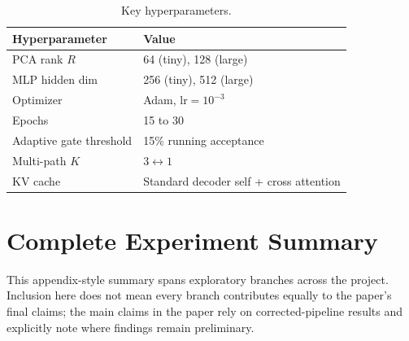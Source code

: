 \documentclass[11pt,a4paper]{article}
\begin{document}
\begin{table}[H]
\centering
\small
\begin{tabular}{@{}ll@{}}
\toprule
\textbf{Hyperparameter} & \textbf{Value} \\
\midrule
PCA rank $R$ & 64 (tiny), 128 (large) \\
MLP hidden dim & 256 (tiny), 512 (large) \\
Optimizer & Adam, $\mathrm{lr}=10^{-3}$ \\
Epochs & 15 to 30 \\
Adaptive gate threshold & 15\% running acceptance \\
Multi-path $K$ & $3 \leftrightarrow 1$ \\
KV cache & Standard decoder self + cross attention \\
\bottomrule
\end{tabular}
\caption{Key hyperparameters.}
\label{tab:hyper}
\end{table}

\section{Complete Experiment Summary}
\label{app:experiments}

This appendix-style summary spans exploratory branches across the project. Inclusion here does not mean every branch contributes equally to the paper's final claims; the main claims in the paper rely on corrected-pipeline results and explicitly note where findings remain preliminary.
\end{document}
